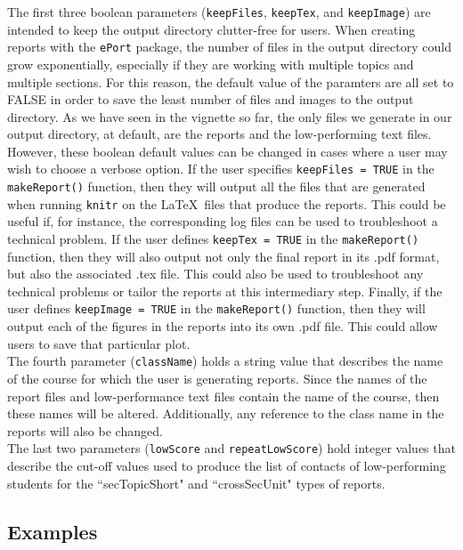 \documentclass{article}\usepackage[]{graphicx}\usepackage[]{color}
\numberwithin{equation}{section} %
\begin{document}
The first three boolean parameters (\texttt{keepFiles}, \texttt{keepTex}, and \texttt{keepImage}) are intended to keep the output directory clutter-free for users. When creating reports with the \texttt{ePort} package, the number of files in the output directory could grow exponentially, especially if they are working with multiple topics and multiple sections. For this reason, the default value of the paramters are all set to FALSE in order to save the least number of files and images to the output directory. As we have seen in the vignette so far, the only files we generate in our output directory, at default, are the reports and the low-performing text files.\\

However, these boolean default values can be changed in cases where a user may wish to choose a verbose option. If the user specifies \texttt{keepFiles = TRUE} in the \texttt{makeReport()} function, then they will output all the files that are generated when running \texttt{knitr} on the \LaTeX\  files that produce the reports. This could be useful if, for instance, the corresponding log files can be used to troubleshoot a technical problem. If the user defines \texttt{keepTex = TRUE} in the \texttt{makeReport()} function, then they will also output not only the final report in its .pdf format, but also the associated .tex file. This could also be used to troubleshoot any technical problems or tailor the reports at this intermediary step. Finally, if the user defines \texttt{keepImage = TRUE} in the \texttt{makeReport()} function, then they will output each of the figures in the reports into its own .pdf file. This could allow users to save that particular plot.\\

The fourth parameter (\texttt{className}) holds a string value that describes the name of the course for which the user is generating reports. Since the names of the report files and low-performance text files contain the name of the course, then these names will be altered. Additionally, any reference to the class name in the reports will also be changed.\\

The last two parameters (\texttt{lowScore} and \texttt{repeatLowScore}) hold integer values that describe the cut-off values used to produce the list of contacts of low-performing students for the ``secTopicShort" and ``crossSecUnit" types of reports. \\

\subsection{Examples}
\end{document}

